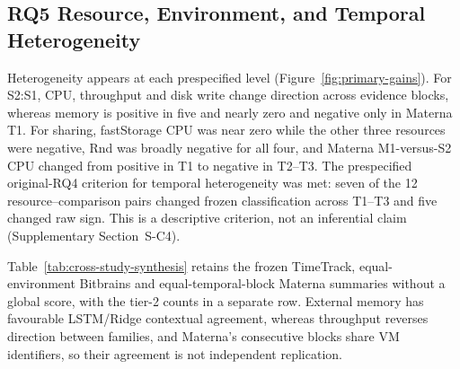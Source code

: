 \documentclass[5p,twocolumn]{elsarticle}
\begin{document}
\subsection{RQ5 Resource, Environment, and Temporal Heterogeneity}
\label{sec:results-rq4}
\label{sec:cross-dataset-synthesis}

Heterogeneity appears at each prespecified level
(Figure~\ref{fig:primary-gains}). For S2:S1, CPU, throughput and disk write
change direction across evidence blocks, whereas memory is positive in five
and nearly zero and negative only in Materna T1. For sharing, fastStorage CPU
was near zero while the other three resources were negative, Rnd was broadly
negative for all four, and Materna M1-versus-S2 CPU changed from positive in
T1 to negative in T2--T3. The prespecified original-RQ4 criterion for temporal
heterogeneity was met: seven of the 12 resource--comparison pairs changed
frozen classification across T1--T3 and five changed raw sign. This is a
descriptive criterion, not an inferential claim (Supplementary
Section~S-C4).

Table~\ref{tab:cross-study-synthesis} retains the frozen TimeTrack,
equal-environment Bitbrains and equal-temporal-block Materna summaries without
a global score, with the tier-2 counts in a separate row. External memory has
favourable LSTM/Ridge contextual agreement, whereas throughput reverses
direction between families, and Materna's consecutive blocks share VM
identifiers, so their agreement is not independent replication.
\end{document}
